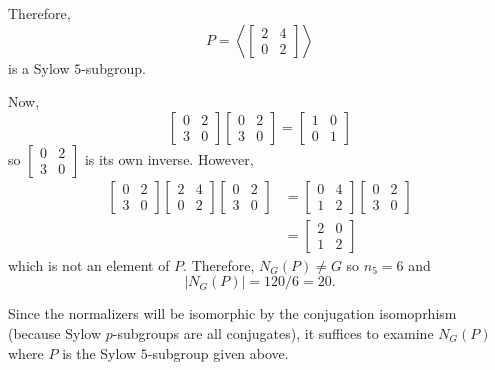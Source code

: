 \documentclass[12pt]{Qual}
\begin{document}
\begin{solution}
\begin{enumerate}[label=(\alph*)]
    Therefore, $$P=\left\langle\begin{bmatrix}
    2 & 4\\
    0 & 2
    \end{bmatrix}\right\rangle$$ is a Sylow $5$-subgroup.

    Now, $$\begin{bmatrix}
    0 & 2\\
    3 & 0
    \end{bmatrix}\begin{bmatrix}
    0 & 2\\
    3 & 0
    \end{bmatrix}=\begin{bmatrix}
    1 & 0\\
    0 & 1
    \end{bmatrix}$$ so $\begin{bmatrix}
    0 & 2\\
    3 & 0
    \end{bmatrix}$ is its own inverse. However, \begin{align*}
        \begin{bmatrix}
    0 & 2\\
    3 & 0
    \end{bmatrix}\begin{bmatrix}
    2 & 4\\
    0 & 2
    \end{bmatrix}\begin{bmatrix}
    0 & 2\\
    3 & 0
    \end{bmatrix}&=\begin{bmatrix}
    0 & 4\\
    1 & 2
    \end{bmatrix}\begin{bmatrix}
    0 & 2\\
    3 & 0
    \end{bmatrix}\\
    &=\begin{bmatrix}
    2 & 0\\
    1 & 2
    \end{bmatrix}
    \end{align*} which is not an element of $P$. Therefore, $N_G(P)\not=G$ so $n_5=6$ and $$|N_G(P)|=120/6=20.$$

    Since the normalizers will be isomorphic by the conjugation isomoprhism (because Sylow $p$-subgroups are all conjugates), it suffices to examine $N_G(P)$ where $P$ is the Sylow $5$-subgroup given above.


\end{enumerate}
\end{solution}
\end{document}
